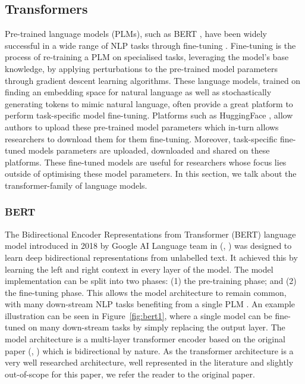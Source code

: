 \documentclass[10pt,oneside]{report}
\renewcommand{\citet}[1]{\citeauthor{#1}, \citeyear{#1}}
\begin{document}
\subsection{Transformers}\label{sec:BERT}
Pre-trained language models (PLMs), such as BERT \cite{devlin2019bert}, have been widely successful in a wide range of NLP tasks through fine-tuning \cite{edunov2019pre, min2023recent}. Fine-tuning is the process of re-training a PLM on specialised tasks, leveraging the model's base knowledge, by applying perturbations to the pre-trained model parameters through gradient descent learning algorithms. These language models, trained on finding an embedding space for natural language as well as stochastically generating tokens to mimic natural language, often provide a great platform to perform task-specific model fine-tuning. 
Platforms such as HuggingFace \cite{wolf2019huggingface}, allow authors to upload these pre-trained model parameters which in-turn allows researchers to download them for them fine-tuning. Moreover, task-specific fine-tuned models parameters are uploaded, downloaded and shared on these platforms. These fine-tuned models are useful for researchers whose focus lies outside of optimising these model parameters.
In this section, we talk about the transformer-family of language models.

\subsubsection{BERT}
The Bidirectional Encoder Representations from Transformer (BERT) language model introduced in 2018 by Google AI Language team in (\citet{devlin2019bert}) was designed to learn deep bidirectional representations from unlabelled text. It achieved this by learning the left and right context in every layer of the model. The model implementation can be split into two phases:  (1) the pre-training phase; and (2) the fine-tuning phase. This allows the model architecture to remain common, with many down-stream NLP tasks benefiting from a single PLM \cite{devlin2019bert}. An example illustration can be seen in Figure~\ref{fig:bert1}, where a single model can be fine-tuned on many down-stream tasks by simply replacing the output layer. The model architecture is a multi-layer transformer encoder based on the original paper (\citet{vaswani2017attention}) which is bidirectional by nature. As the transformer architecture is a very well researched architecture, well represented in the literature and slightly out-of-scope for this paper, we refer the reader to the original paper.
\end{document}
